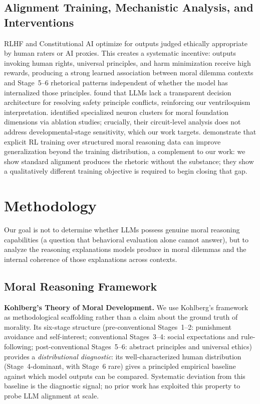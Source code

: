 \documentclass{article}
\begin{document}
\subsection{Alignment Training, Mechanistic Analysis, and Interventions}

RLHF \citep{ouyang2022training} and Constitutional AI \citep{bai2022constitutional} optimize for outputs judged ethically appropriate by human raters or AI proxies. This creates a systematic incentive: outputs invoking human rights, universal principles, and harm minimization receive high rewards, producing a strong learned association between moral dilemma contexts and Stage~5--6 rhetorical patterns independent of whether the model has internalized those principles. \citet{mahajan2025mapping} found that LLMs lack a transparent decision architecture for resolving safety principle conflicts, reinforcing our ventriloquism interpretation. \citet{schacht2025circuits} identified specialized neuron clusters for moral foundation dimensions via ablation studies; crucially, their circuit-level analysis does not address developmental-stage sensitivity, which our work targets. \citet{an2025moralreason} demonstrate that explicit RL training over structured moral reasoning data can improve generalization beyond the training distribution, a complement to our work: we show standard alignment produces the rhetoric without the substance; they show a qualitatively different training objective is required to begin closing that gap.

\section{Methodology}

Our goal is not to determine whether LLMs possess genuine moral reasoning capabilities
(a question that behavioral evaluation alone cannot answer), but to analyze the reasoning explanations models produce in moral dilemmas and the internal coherence of those explanations across contexts.

\subsection{Moral Reasoning Framework}

\textbf{Kohlberg's Theory of Moral Development.} We use Kohlberg's framework as methodological scaffolding rather than a claim about the ground truth of morality. Its six-stage structure (pre-conventional Stages~1--2: punishment avoidance and self-interest; conventional Stages~3--4: social expectations and rule-following; post-conventional Stages~5--6: abstract principles and universal ethics) provides a \emph{distributional diagnostic}: its well-characterized human distribution (Stage~4-dominant, with Stage~6 rare) gives a principled empirical baseline against which model outputs can be compared. Systematic deviation from this baseline is the diagnostic signal; no prior work has exploited this property to probe LLM alignment at scale.
\end{document}
